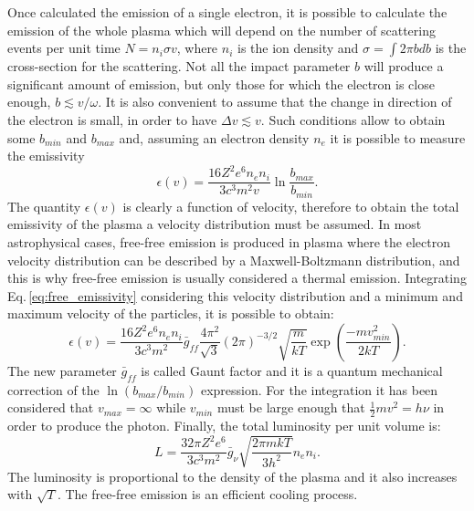 \documentclass[../main.tex]{subfiles}
\begin{document}
Once calculated the emission of a single electron, it is possible to calculate the emission of the whole plasma which will depend on the number of scattering events per unit time $N = n_i \sigma v$, where $n_i$ is the ion density and $\sigma = \int 2\pi b db$ is the cross-section for the scattering.
Not all the impact parameter $b$ will produce a significant amount of emission, but only those for which the electron is close enough, $b\lesssim v/\omega$. 
It is also convenient to assume that the change in direction of the electron is small, in order to have $\Delta v \lesssim v$.
Such conditions allow to obtain some $b_{min}$ and $b_{max}$ and, assuming an electron density $n_e$ it is possible to measure the emissivity
\begin{equation}
    \label{eq:free_emissivity} 
    \epsilon(v) = \frac{16 Z^2 e^6 n_e n_i}{3c^3m^2v}\ln\frac{b_{max}}{b_{min}}.
\end{equation}
The quantity $\epsilon(v)$ is clearly a function of velocity, therefore to obtain the total emissivity of the plasma a velocity distribution must be assumed.
In most astrophysical cases, free-free emission is produced in plasma where the electron velocity distribution can be described by a Maxwell-Boltzmann distribution, and this is why free-free emission is usually considered a thermal emission.
Integrating Eq.\,\ref{eq:free_emissivity} considering this velocity distribution and a minimum and maximum velocity of the particles, it is possible to obtain:
\begin{equation}
    \label{eq:free_emissivity_total}
    \epsilon(v) = \frac{16 Z^2 e^6 n_e n_i}{3c^3m^2}\bar{g}_{ff}\frac{4\pi^2}{\sqrt 3}(2\pi)^{-3/2}\sqrt{\frac{m}{kT}} \exp\left(\frac{-mv^2_{min}}{2kT}\right).
\end{equation}
The new parameter $\bar{g}_{ff}$ is called Gaunt factor and it is a quantum mechanical correction of the $\ln(b_{max}/b_{min})$ expression.
For the integration it has been considered that $v_{max} = \infty$ while $v_{min}$ must be large enough that $\frac{1}{2}mv^2 = h\nu$ in order to produce the photon.
Finally, the total luminosity per unit volume is:
\begin{equation}
    \label{eq:free_lum_tot}
    L=\frac{32 \pi Z^2 e^6}{3c^3m^2}\bar{g}_{\nu}\sqrt{\frac{2 \pi m k T}{3h^2}}n_e n_i.
\end{equation}
The luminosity is proportional to the density of the plasma and it also increases with $\sqrt T$.
The free-free emission is an efficient cooling process.
\end{document}
